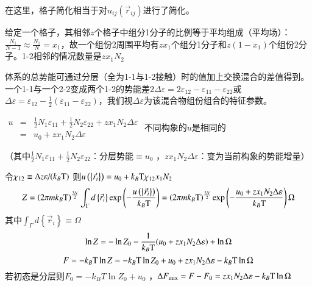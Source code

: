 \documentclass{article} %
\begin{document}
\noindent 在这里，格子简化相当于对$u_{ij} \left(\vec{r}_{ij} \right)$进行了简化。

\noindent 给定一个格子，其相邻$z$个格子中组分1分子的比例等于平均组成（平均场）：$\frac{N_{1} }{N-1} \approx \frac{N_{1} }{N} =x_{1} $，故一个组份2周围平均有$zx_{1} $个组分1分子和$z\left(1-x_{1} \right)$个组份2分子。1-2相邻的情况数量是$zx_{1} N_{2} $ 

\noindent 体系的总势能可通过分层（全为1-1与1-2接触）时的值加上交换混合的差值得到。一个1-1与一个2-2变成两个1-2的势能差$2\Delta \varepsilon =2\varepsilon _{12} -\varepsilon _{11} -\varepsilon _{22} $或$\Delta \varepsilon =\varepsilon _{12} -\frac{1}{2} \left(\varepsilon _{11} -\varepsilon _{22} \right)$，我们视$\Delta \varepsilon $为该混合物组份组合的特征参数。

 $\begin{array}{rcl} {u} & {=} & {\frac{1}{2} N_{1} \varepsilon _{11} +\frac{1}{2} N_{2} \varepsilon _{22} +zx_{1} N_{2} \Delta \varepsilon } \\ {} & {=} & {u_{0} +zx_{1} N_{2} \Delta \varepsilon } \end{array}$  不同构象的$u$是相同的

\noindent （其中$\frac{1}{2} N_{1} \varepsilon _{11} +\frac{1}{2} N_{2} \varepsilon _{22} $：分层势能$\equiv u_{0} $ ，$zx_{1} N_{2} \Delta \varepsilon $：变为当前构象的势能增量）

\noindent 令$\chi _{12} \equiv {\Delta z\varepsilon \mathord{\left/ {\vphantom {\Delta z\varepsilon  (k_{B} {\rm T} }} \right. \kern-\nulldelimiterspace} (k_{B} {\rm T} } )$ 则$u\left(\left\{\vec{r}_{i} \right\}\right)=u_{0} +k_{B} {\rm T} \chi _{12} x_{1} N_{2} $ 
\[Z=\left(2\pi mk_{B} {\rm T} \right)^{\frac{3N}{2} } \int _{\Gamma }d\left\{\vec{r}_{i} \right\} \exp \left(-\frac{u\left(\left\{\vec{r}_{i} \right\}\right)}{k_{B} {\rm T} } \right)=\left(2\pi mk_{B} {\rm T} \right)^{\frac{3N}{2} } \exp \left(-\frac{u_{0} +zx_{1} N_{2} \Delta \varepsilon }{k_{B} {\rm T} } \right)\Omega \] 
其中$\int _{\Gamma }d\left\{\vec{r}_{i} \right\} \equiv \Omega $ 
\[\ln Z=-\ln Z_{0} -\frac{1}{k_{B} {\rm T} } (u_{0} +zx_{1} N_{2} {\rm \Delta }\varepsilon )+\ln \Omega \] 
\[F=-k_{B} {\rm T} \ln Z=-k_{B} {\rm T} \ln Z_{0} +u_{0} +zx_{1} N_{2} \Delta \varepsilon -k_{B} {\rm T} \ln \Omega \] 
若初态是分层则$F_{0} =-k_{B} T\ln Z_{0} +u_{0} $ ，${\rm \Delta }F_{{\rm mix}} =F-F_{0} =zx_{1} N_{2} {\rm \Delta }\varepsilon -k_{B} {\rm T} \ln {\rm \Omega }$ 
\end{document}
